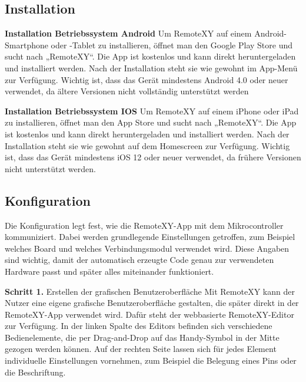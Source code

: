 \subsection{Installation}
\textbf{Installation Betriebssystem Android}
Um RemoteXY auf einem Android-Smartphone oder -Tablet zu installieren, öffnet man den Google Play Store und sucht nach „RemoteXY“. Die App ist kostenlos und kann direkt heruntergeladen und installiert werden. Nach der Installation steht sie wie gewohnt im App-Menü zur Verfügung. Wichtig ist, dass das Gerät mindestens Android 4.0 oder neuer verwendet, da ältere Versionen nicht vollständig unterstützt werden
\cite{RemoteXY:GooglePlayStore}

\vspace{1\baselineskip}

\textbf{Installation Betriebssystem IOS}
Um RemoteXY auf einem iPhone oder iPad zu installieren, öffnet man den App Store und sucht nach „RemoteXY“. Die App ist kostenlos und kann direkt heruntergeladen und installiert werden. Nach der Installation steht sie wie gewohnt auf dem Homescreen zur Verfügung. Wichtig ist, dass das Gerät mindestens iOS 12 oder neuer verwendet, da frühere Versionen nicht unterstützt werden.
\cite{RemoteXY:AppStore}

\subsection{Konfiguration}
Die Konfiguration legt fest, wie die RemoteXY-App mit dem Mikrocontroller kommuniziert. Dabei werden grundlegende Einstellungen getroffen, zum Beispiel welches Board und welches Verbindungsmodul verwendet wird. Diese Angaben sind wichtig, damit der automatisch erzeugte Code genau zur verwendeten Hardware passt und später alles miteinander funktioniert.
\cite{RemoteXY:Install}

\vspace{1\baselineskip}

\textbf{Schritt 1.} Erstellen der grafischen Benutzeroberfläche
Mit RemoteXY kann der Nutzer eine eigene grafische Benutzeroberfläche gestalten, die später direkt in der RemoteXY-App verwendet wird. Dafür steht der webbasierte RemoteXY-Editor zur Verfügung. In der linken Spalte des Editors befinden sich verschiedene Bedienelemente, die per Drag-and-Drop auf das Handy-Symbol in der Mitte gezogen werden können. Auf der rechten Seite lassen sich für jedes Element individuelle Einstellungen vornehmen, zum Beispiel die Belegung eines Pins oder die Beschriftung.
\cite{RemoteXY:Install}

